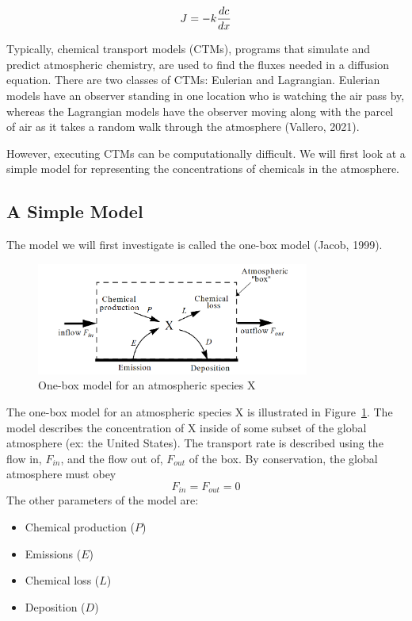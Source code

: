 \documentclass{article}
\begin{document}
\begin{equation}
    J = -k \* \frac{dc}{dx}
\end{equation}

Typically, chemical transport models (CTMs), programs that simulate and predict atmospheric chemistry, are used to find the fluxes needed in a diffusion equation. 
There are two classes of CTMs: Eulerian and Lagrangian. Eulerian models have an observer standing in one location who is watching the air pass by, 
whereas the Lagrangian models have the observer moving along with the parcel of air as it takes a random walk through the atmosphere (Vallero, 2021).

However, executing CTMs can be computationally difficult. We will first look at a simple model for representing the concentrations of chemicals in the 
atmosphere.

\subsection{A Simple Model}

The model we will first investigate is called the one-box model (Jacob, 1999).

\begin{figure}[h]
   \centering
   \includegraphics[width=0.8\textwidth]{atmospheric_model.png}
   \caption{One-box model for an atmospheric species X}
   \label{fig:atmospheric_box_model}
\end{figure}

The one-box model for an atmospheric species X is illustrated in Figure~\ref{fig:atmospheric_box_model}. 
The model describes the concentration of X inside of some subset of the global atmosphere (ex: the United States).
The transport rate is described using the flow in, $F_{in}$, and the flow out of, $F_{out}$ of the box. By conservation, the global
atmosphere must obey
$$
    F_{in} = F_{out} = 0
$$
The other parameters of the model are:
\begin{itemize}
   \item Chemical production ($P$)
   \item Emissions ($E$)
   \item Chemical loss ($L$)
   \item Deposition ($D$)
\end{itemize}
\end{document}
